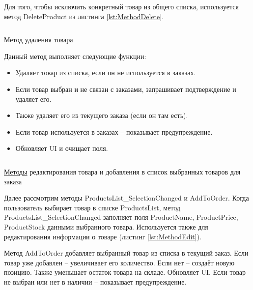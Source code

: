 \documentclass[12pt]{article}
\newcommand{\colorGIT}[1]{\textcolor{CtpLavender}{#1}}
\renewcommand{\texttt}[1]{{\small\ttfamily #1}}
\numberwithin{listing}{section}
\numberwithin{figure}{section}
\begin{document}
Для того, чтобы исключить конкретный товар из общего списка, используется метод \texttt{Delete\-Product} из листинга \ref{lst:MethodDelete}.


\begin{listing}[H]
	\inputminted[firstline=112, lastline=141]{csharp}{../../3lab/StoreManager/MainWindow.xaml.cs}
	\caption{\colorGIT{\href{https://github.com/WebMasterIT/Csharp_Labs/blob/ec375afd16c0647b337cf3d8a79c8bef904fc1be/3lab/StoreManager/MainWindow.xaml.cs\#L112-L141}{Метод}} удаления товара}
	\label{lst:MethodDelete}
\end{listing}

\noindent Данный метод выполняет следующие функции:
\begin{itemize}
	\item Удаляет товар из списка, если он не используется в заказах.
	\item Если товар выбран и не связан с заказами, запрашивает подтверждение и удаляет его.
	\item Также удаляет его из текущего заказа (если он там есть).
	\item Если товар используется в заказах -- показывает предупреждение.
	\item Обновляет \texttt{UI} и очищает поля.
\end{itemize}


\begin{listing}[H]
	\inputminted[firstline=143, lastline=184]{csharp}{../../3lab/StoreManager/MainWindow.xaml.cs}
	\caption{\colorGIT{\href{https://github.com/WebMasterIT/Csharp_Labs/blob/ec375afd16c0647b337cf3d8a79c8bef904fc1be/3lab/StoreManager/MainWindow.xaml.cs\#L143-L184}{Методы}} редактирования товара и добавления в список выбранных товаров для заказа}
	\label{lst:MethodEdit}
\end{listing}


Далее рассмотрим методы \texttt{ProductsList\_SelectionChanged} и \texttt{AddToOrder}. Когда пользователь выбирает товар в списке \texttt{ProductsList}, метод \texttt{ProductsList\_SelectionChanged} заполняет поля \texttt{Product\-Name}, \texttt{ProductPrice}, \texttt{ProductStock} данными выбранного товара. Используется также для редактирования информации о товаре (листинг \ref{lst:MethodEdit}).

Метод \texttt{AddToOrder} добавляет выбранный товар из списка в текущий заказ.
Если товар уже добавлен -- увеличивает его количество.
Если нет -- создаёт новую позицию.
Также уменьшает остаток товара на складе.
Обновляет \texttt{UI}.
Если товар не выбран или нет в наличии -- показывает предупреждение.
\end{document}
